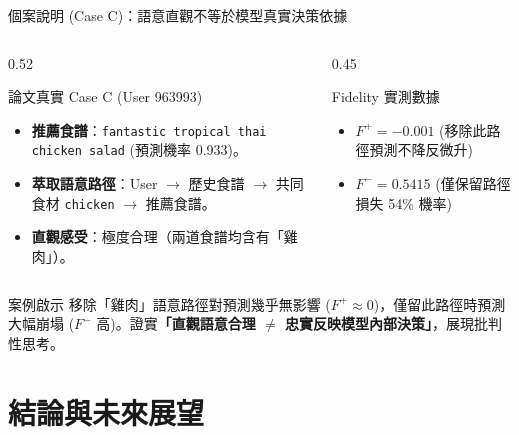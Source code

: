 \documentclass[aspectratio=169, 10pt]{beamer}
\begin{document}
\begin{frame}{個案說明 (Case C)：語意直觀不等於模型真實決策依據}
  \begin{columns}[T]
    \begin{column}{0.52\textwidth}
      \begin{block}{論文真實 Case C (User 963993)}
        \begin{itemize}
          \item \textbf{推薦食譜}：\texttt{fantastic tropical thai chicken salad} (預測機率 0.933)。
          \item \textbf{萃取語意路徑}：User $\rightarrow$ 歷史食譜 $\rightarrow$ 共同食材 \texttt{chicken} $\rightarrow$ 推薦食譜。
          \item \textbf{直觀感受}：極度合理（兩道食譜均含有「雞肉」）。
        \end{itemize}
      \end{block}
    \end{column}
    
    \begin{column}{0.45\textwidth}
      \begin{alertblock}{Fidelity 實測數據}
        \begin{itemize}
          \item \textbf{$F^+ = -0.001$} (移除此路徑預測不降反微升)
          \item \textbf{$F^- = 0.5415$} (僅保留路徑損失 54\% 機率)
        \end{itemize}
      \end{alertblock}
    \end{column}
  \end{columns}
  
  \vspace{0.2cm}
  \begin{exampleblock}{案例啟示}
    移除「雞肉」語意路徑對預測幾乎無影響 ($F^+ \approx 0$)，僅留此路徑時預測大幅崩塌 ($F^-$ 高)。證實\textbf{「直觀語意合理 $\neq$ 忠實反映模型內部決策」}，展現批判性思考。
  \end{exampleblock}
\end{frame}

\section{結論與未來展望}
\end{document}
